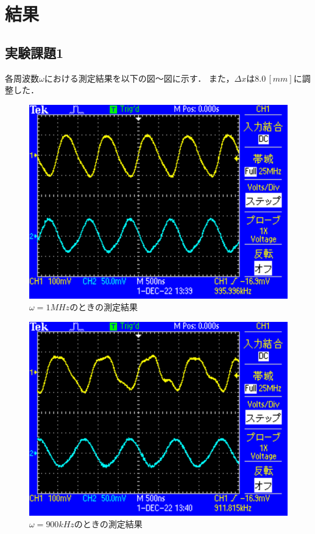 
\section{結果}

\subsection{実験課題1}
各周波数$\omega$における測定結果を以下の図～図に示す．
また，$\Delta x$は$8.0\,[\si{mm}]$に調整した．

\begin{figure}[H]
    \centering
    \includegraphics[scale=0.5]{TEK0001.pdf}
    \caption{$\omega=1\si{MHz}$のときの測定結果}
\end{figure}

\begin{figure}[H]
    \centering
    \includegraphics[scale=0.5]{TEK0002.pdf}
    \caption{$\omega=900\si{kHz}$のときの測定結果}
\end{figure}

